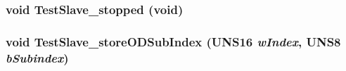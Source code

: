\subsubsection{\setlength{\rightskip}{0pt plus 5cm}void Test\-Slave\_\-stopped (void)}\label{Slave_8h_96183a276490a2d87f2c16698d44949e}


\subsubsection{\setlength{\rightskip}{0pt plus 5cm}void Test\-Slave\_\-store\-ODSub\-Index (UNS16 {\em w\-Index}, UNS8 {\em b\-Subindex})}\label{Slave_8h_0461b31d30605aa041476ae5ef4656b7}


